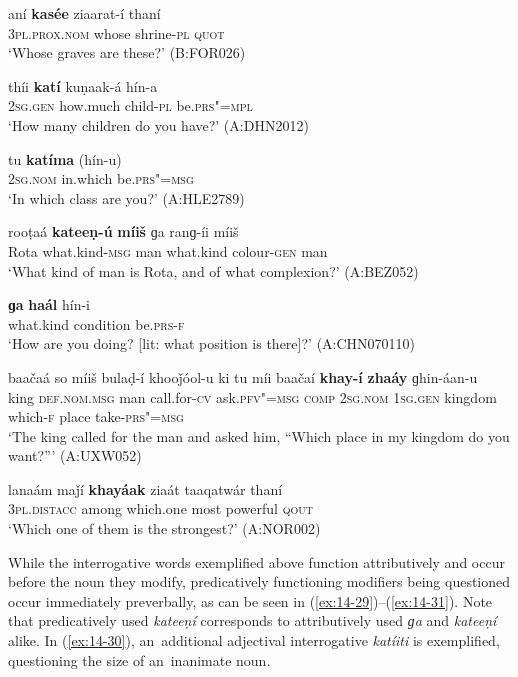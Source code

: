 \begin{exe}
\ex
\label{ex:14-23}
\gll aní \textbf{kasée} ziaarat-í thaní \\
\textsc{3pl.prox.nom} whose shrine-\textsc{pl} \textsc{quot} \\
\glt `Whose graves are these?' (B:FOR026)

\ex
\label{ex:14-24}
\gll thíi \textbf{katí} kuṇaak-á hín-a \\
\textsc{2sg.gen} how.much child-\textsc{pl} be.\textsc{prs"=mpl} \\
\glt `How many children do you have?' (A:DHN2012)

\ex
\label{ex:14-25}
\gll tu \textbf{katíma} (hín-u) \\
\textsc{2sg.nom} in.which be.\textsc{prs"=msg} \\
\glt `In which class are you?' (A:HLE2789)

\ex
\label{ex:14-26}
\gll rooṭaá \textbf{kateeṇ-ú} \textbf{míiš} ɡa ranɡ-íi  míiš \\
Rota what.kind-\textsc{msg} man what.kind colour-\textsc{gen} man  \\
\glt `What kind of man is Rota, and of what complexion?' (A:BEZ052)

\ex
\label{ex:14-27}
\gll \textbf{ɡa} \textbf{haál} hín-i \\
what.kind condition be.\textsc{prs-f} \\
\glt `How are you doing? [lit: what position is there]?' (A:CHN070110)

\ex
\label{ex:14-28}
\gll baačaá so míiš bulaḍ-í khooǰóol-u ki tu míi baačaí \textbf{khay-í} \textbf{zhaáy} ɡhin-áan-u \\
king \textsc{def.nom.msg} man call.for-\textsc{cv} ask.\textsc{pfv"=msg} \textsc{comp} \textsc{2sg.nom} \textsc{1sg.gen} kingdom which-\textsc{f} place take-\textsc{prs"=msg}  \\
\glt `The king called for the man and asked him, ``Which place in my kingdom do you want?''' (A:UXW052)

\ex
\label{ex:14-28b}
\gll lanaám maǰí \textbf{khayáak} ziaát taaqatwár thaní\\
\textsc{3pl.distacc} among which.one most powerful \textsc{qout}\\
\glt `Which one of them is the strongest?' (A:NOR002)
\end{exe}




While the interrogative words exemplified above function attributively and occur before the noun they modify, predicatively functioning modifiers being questioned occur immediately preverbally, as can be seen in (\ref{ex:14-29})--(\ref{ex:14-31}). Note that predicatively used \textit{kateeṇí} corresponds to attributively used \textit{ɡa} and \textit{kateeṇí} alike. In (\ref{ex:14-30}), an~additional adjectival interrogative \textit{katíiti} is exemplified, questioning the size of an~inanimate noun.

